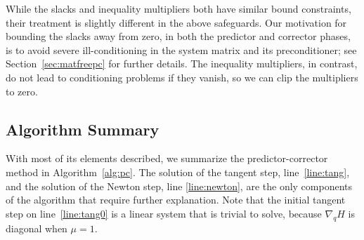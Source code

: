 While the slacks and inequality multipliers both have similar bound constraints, their treatment is
slightly different in the above safeguards.  Our motivation for bounding the
slacks away from zero, in both the predictor and corrector phases, is to avoid
severe ill-conditioning in the system matrix and its preconditioner; see
Section~\ref{sec:matfreepc} for further details.  The inequality multipliers, in contrast,
do not lead to conditioning problems if they vanish, so we can clip the
multipliers to zero.

\subsection{Algorithm Summary}

With most of its elements described, we summarize the predictor-corrector method
in Algorithm~\ref{alg:pc}.  The solution of the tangent step,
line~\ref{line:tang}, and the solution of the Newton step, line
\ref{line:newton}, are the only components of the algorithm that require further
explanation.  Note that the initial tangent step on line~\ref{line:tang0} is a linear system that 
is trivial to solve, because $\nabla_q H$ is diagonal when $\mu=1$. %
\\
\LinesNumberedHidden
